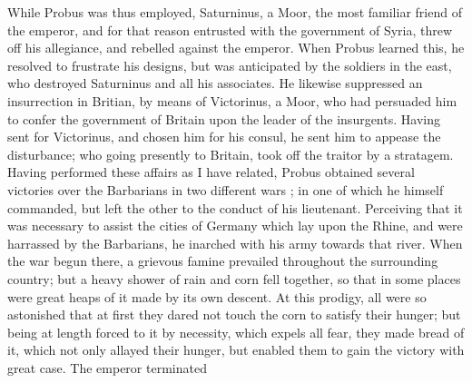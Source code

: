 While Probus was thus employed, Saturninus, a Moor, the most familiar friend of the emperor, and for that reason entrusted with the government of Syria, threw off his allegiance, and rebelled against the emperor. When Probus learned this, he resolved to frustrate his designs, but was anticipated by the soldiers in the east, who destroyed Saturninus and all his associates. He likewise suppressed an insurrection in Britian, by means of Victorinus, a Moor, who had persuaded him to confer the government of Britain upon the leader of the insurgents. Having sent for Victorinus, and chosen him for his consul, he sent him to appease the disturbance; who going presently to Britain, took off the traitor by a stratagem. Having performed these affairs as I have related, Probus obtained several victories over the Barbarians in two different wars ; in one of which he himself commanded, but left the other to the conduct of his lieutenant. Perceiving that it was necessary to assist the cities of Germany which lay upon the Rhine, and were harrassed by the Barbarians, he inarched with his army towards that river. When the war begun there, a grievous famine prevailed throughout the surrounding country; but a heavy shower of rain and corn fell together, so that in some places were great heaps of it made by its own descent. At this prodigy, all were so astonished that at first they dared not touch the corn to satisfy their hunger; but being at length forced to it by necessity, which expels all fear, they made bread of it, which not only allayed their hunger, but enabled them to gain the victory with great case. The emperor terminated
